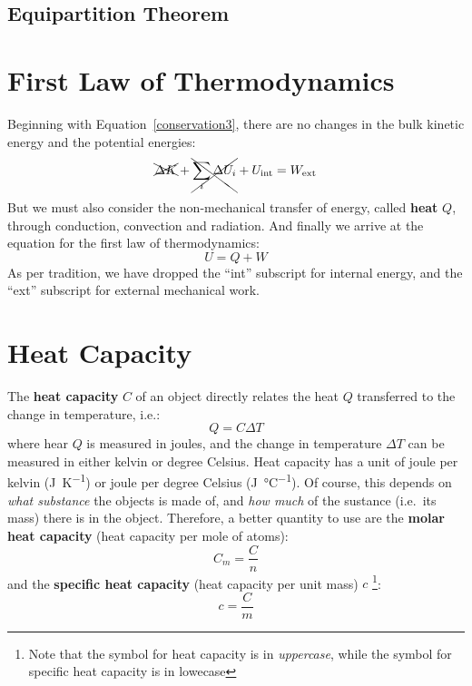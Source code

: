 \documentclass[11pt]{article}
\begin{document}
\subsection{Equipartition Theorem}

\section{First Law of Thermodynamics}
Beginning with Equation~\ref{conservation3}, there are no changes in the bulk
kinetic energy and the potential energies:
\begin{equation}
  \xcancel{\Delta K} + \xcancel{\sum_i\Delta U_i} + U_\text{int}=
  W_\text{ext}
\end{equation}
But we must also consider the non-mechanical transfer of energy, called
\textbf{heat} $Q$, through conduction, convection and radiation. And finally
we arrive at the equation for the first law of thermodynamics:
\begin{equation}
  \boxed{ U = Q + W }
\end{equation}
As per tradition, we have dropped the ``int'' subscript for internal energy,
and the ``ext'' subscript for external mechanical work.


\section{Heat Capacity}
The \textbf{heat capacity} $C$ of an object directly relates the heat $Q$
transferred to the change in temperature, i.e.:
\begin{equation}
  Q = C\Delta T
  \label{eq:heat-capacity}
\end{equation}
where hear $Q$ is measured in joules, and the change in temperature $\Delta T$
can be measured in either kelvin or degree Celsius. Heat capacity has a unit of
joule per kelvin (\si{\joule\per\kelvin}) or joule per degree Celsius
(\si{\joule\per\celsius}). Of course, this depends on \emph{what substance} the
objects is made of, and \emph{how much} of the sustance (i.e.\ its mass) there
is in the object. Therefore, a better quantity to use are the
\textbf{molar heat capacity} (heat capacity per mole of atoms):
\begin{equation}
  C_m=\frac Cn
\end{equation}
and the \textbf{specific heat capacity} (heat capacity per unit mass) $c$
\footnote{Note that the symbol for heat capacity is in \emph{uppercase},
  while the symbol for specific heat capacity is in lowecase}:
\begin{equation}
  c=\frac Cm%
  \label{eq:specific-heat}
\end{equation}
\end{document}
